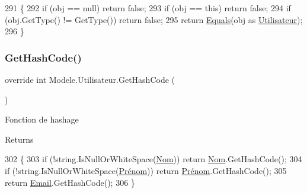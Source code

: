 \begin{DoxyCode}
291         \{
292             \textcolor{keywordflow}{if} (obj == null) \textcolor{keywordflow}{return} \textcolor{keyword}{false};
293             \textcolor{keywordflow}{if} (obj == \textcolor{keyword}{this}) \textcolor{keywordflow}{return} \textcolor{keyword}{false};
294             \textcolor{keywordflow}{if} (obj.GetType() != GetType()) \textcolor{keywordflow}{return} \textcolor{keyword}{false};
295             \textcolor{keywordflow}{return} \hyperlink{classModele_1_1Utilisateur_a9e1dffc7b478d59609cd06ad0bd58007}{Equals}(obj as \hyperlink{classModele_1_1Utilisateur_a1d5c1f87797e60515771e6510c264436}{Utilisateur});
296         \}
\end{DoxyCode}
\mbox{\label{classModele_1_1Utilisateur_ae84ea80af70b350ccc13e4210f400950}} 
\subsubsection{\texorpdfstring{Get\+Hash\+Code()}{GetHashCode()}}
{\footnotesize\ttfamily override int Modele.\+Utilisateur.\+Get\+Hash\+Code (\begin{DoxyParamCaption}{ }\end{DoxyParamCaption})\hspace{0.3cm}{\ttfamily [inline]}}



Fonction de hashage 

\begin{DoxyReturn}{Returns}

\end{DoxyReturn}

\begin{DoxyCode}
302         \{
303             \textcolor{keywordflow}{if} (!\textcolor{keywordtype}{string}.IsNullOrWhiteSpace(\hyperlink{classModele_1_1Utilisateur_a2aa56cab9101d6c24445d3d6e1a7640d}{Nom})) \textcolor{keywordflow}{return} \hyperlink{classModele_1_1Utilisateur_a2aa56cab9101d6c24445d3d6e1a7640d}{Nom}.GetHashCode();
304             \textcolor{keywordflow}{if} (!\textcolor{keywordtype}{string}.IsNullOrWhiteSpace(\hyperlink{classModele_1_1Utilisateur_a8be63c78df8f6d3bbeb8f6ceb7197975}{Prénom})) \textcolor{keywordflow}{return} \hyperlink{classModele_1_1Utilisateur_a8be63c78df8f6d3bbeb8f6ceb7197975}{Prénom}.GetHashCode();
305             \textcolor{keywordflow}{return} \hyperlink{classModele_1_1Utilisateur_a1250bfe957225a47f96f31e5d0c1d305}{Email}.GetHashCode();
306         \}
\end{DoxyCode}
\mbox{\label{classModele_1_1Utilisateur_aa02aa408f6b952e01d356e3f66b543bd}} 
